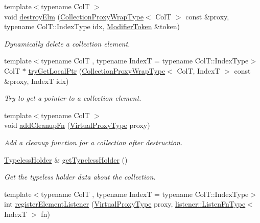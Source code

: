 \begin{DoxyCompactItemize}
{\footnotesize template$<$typename ColT $>$ }\\void \hyperlink{structvt_1_1vrt_1_1collection_1_1_collection_manager_a85a108cba84e45371d2c29d3072adcbe}{destroy\+Elm} (\hyperlink{structvt_1_1vrt_1_1collection_1_1_collection_manager_a56458ed7f9bb22b631b9b3a745f42f94}{Collection\+Proxy\+Wrap\+Type}$<$ ColT $>$ const \&proxy, typename Col\+T\+::\+Index\+Type idx, \hyperlink{structvt_1_1vrt_1_1collection_1_1_modifier_token}{Modifier\+Token} \&token)
\begin{DoxyCompactList}\small\item\em Dynamically delete a collection element. \end{DoxyCompactList}\item 
{\footnotesize template$<$typename ColT , typename IndexT  = typename Col\+T\+::\+Index\+Type$>$ }\\ColT $\ast$ \hyperlink{structvt_1_1vrt_1_1collection_1_1_collection_manager_a09bd0e2b03bd5f638bdc44f7ffeef715}{try\+Get\+Local\+Ptr} (\hyperlink{structvt_1_1vrt_1_1collection_1_1_collection_manager_a56458ed7f9bb22b631b9b3a745f42f94}{Collection\+Proxy\+Wrap\+Type}$<$ ColT, IndexT $>$ const \&proxy, IndexT idx)
\begin{DoxyCompactList}\small\item\em Try to get a pointer to a collection element. \end{DoxyCompactList}\item 
{\footnotesize template$<$typename ColT $>$ }\\void \hyperlink{structvt_1_1vrt_1_1collection_1_1_collection_manager_a3ef00b90a3a2d066a7f83b9c32b301d2}{add\+Cleanup\+Fn} (\hyperlink{namespacevt_a1b417dd5d684f045bb58a0ede70045ac}{Virtual\+Proxy\+Type} proxy)
\begin{DoxyCompactList}\small\item\em Add a cleanup function for a collection after destruction. \end{DoxyCompactList}\item 
\hyperlink{structvt_1_1vrt_1_1collection_1_1_typeless_holder}{Typeless\+Holder} \& \hyperlink{structvt_1_1vrt_1_1collection_1_1_collection_manager_ac6a8ac3b0b5583f426932e95012f8332}{get\+Typeless\+Holder} ()
\begin{DoxyCompactList}\small\item\em Get the typeless holder data about the collection. \end{DoxyCompactList}\item 
{\footnotesize template$<$typename ColT , typename IndexT  = typename Col\+T\+::\+Index\+Type$>$ }\\int \hyperlink{structvt_1_1vrt_1_1collection_1_1_collection_manager_a790738e12739058e7a09b4a3246169e8}{register\+Element\+Listener} (\hyperlink{namespacevt_a1b417dd5d684f045bb58a0ede70045ac}{Virtual\+Proxy\+Type} proxy, \hyperlink{namespacevt_1_1vrt_1_1collection_1_1listener_a0f35a1b6c7c88d9543939a204f418d7a}{listener\+::\+Listen\+Fn\+Type}$<$ IndexT $>$ fn)

\end{DoxyCompactItemize}
